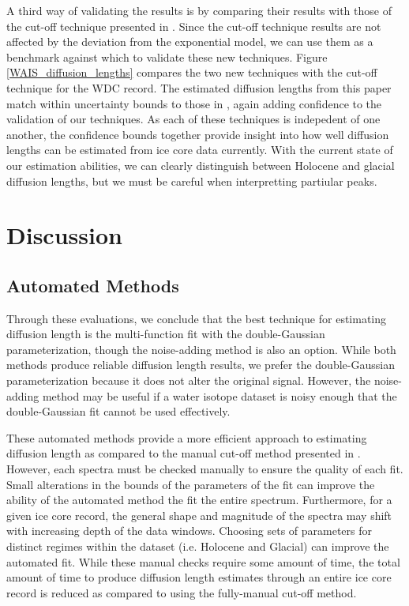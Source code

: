 \documentclass[draft, jgrga]{AGUTeX}
\begin{document}
\begin{article}
A third way of validating the results is by comparing their results with those of the cut-off technique presented in \citet{Jones2017a}. Since the cut-off technique results are not affected by the deviation from the exponential model, we can use them as a benchmark against which to validate these new techniques. Figure \ref{WAIS_diffusion_lengths} compares the two new techniques with the cut-off technique for the WDC record. The estimated diffusion lengths from this paper match within uncertainty bounds to those in \cite{Jones2017a}, again adding confidence to the validation of our techniques. As each of these techniques is indepedent of one another, the confidence bounds together provide insight into how well diffusion lengths can be estimated from ice core data currently. With the current state of our estimation abilities, we can clearly distinguish between Holocene and glacial diffusion lengths, but we must be careful when interpretting partiular peaks.


\section{Discussion}

\subsection{Automated Methods}
Through these evaluations, we conclude that the best technique for estimating diffusion length is the multi-function fit with the double-Gaussian parameterization, though the noise-adding method is also an option. While both methods produce reliable diffusion length results, we prefer the double-Gaussian parameterization because it does not alter the original signal. However, the noise-adding method may be useful if a water isotope dataset is noisy enough that the double-Gaussian fit cannot be used effectively.

These automated methods provide a more efficient approach to estimating diffusion length as compared to the manual cut-off method presented in \citet{Jones2017a}. However, each spectra must be checked manually to ensure the quality of each fit. Small alterations in the bounds of the parameters of the fit can improve the ability of the automated method the fit the entire spectrum. Furthermore, for a given ice core record, the general shape and magnitude of the spectra may shift with increasing depth of the data windows. Choosing sets of parameters for distinct regimes within the dataset (i.e. Holocene and Glacial) can improve the automated fit. While these manual checks require some amount of time, the total amount of time to produce diffusion length estimates through an entire ice core record is reduced as compared to using the fully-manual cut-off method.


\end{article}
\end{document}
